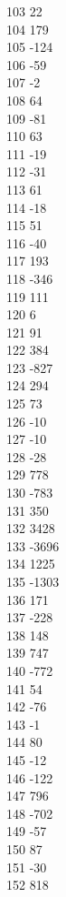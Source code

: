 { 103	22 \\
 104	179 \\
 105	-124 \\
 106	-59 \\
 107	-2 \\
 108	64 \\
 109	-81 \\
 110	63 \\
 111	-19 \\
 112	-31 \\
 113	61 \\
 114	-18 \\
 115	51 \\
 116	-40 \\
 117	193 \\
 118	-346 \\
 119	111 \\
 120	6 \\
 121	91 \\
 122	384 \\
 123	-827 \\
 124	294 \\
 125	73 \\
 126	-10 \\
 127	-10 \\
 128	-28 \\
 129	778 \\
 130	-783 \\
 131	350 \\
 132	3428 \\
 133	-3696 \\
 134	1225 \\
 135	-1303 \\
 136	171 \\
 137	-228 \\
 138	148 \\
 139	747 \\
 140	-772 \\
 141	54 \\
 142	-76 \\
 143	-1 \\
 144	80 \\
 145	-12 \\
 146	-122 \\
 147	796 \\
 148	-702 \\
 149	-57 \\
 150	87 \\
 151	-30 \\
 152	818 \\
}
